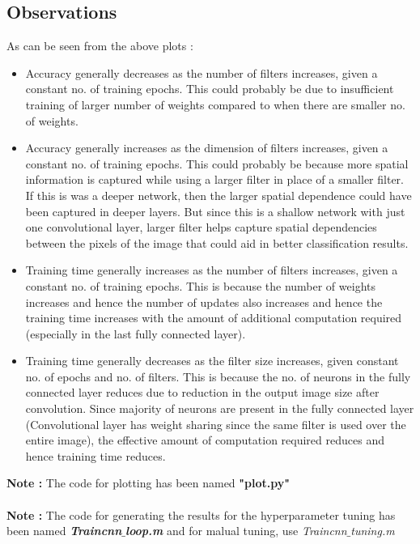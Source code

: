 \documentclass{article} %
\begin{document}
\newpage
\subsection{Observations}
As can be seen from the above plots :
\begin{itemize}
    \item Accuracy generally decreases as the number of filters increases, given a constant no. of training epochs. This could probably be due to insufficient training of larger number of weights compared to when there are smaller no. of weights.
    \item Accuracy generally increases as the dimension of filters increases, given a constant no. of training epochs. This could probably be because more spatial information is captured while using a larger filter in place of a smaller filter. If this is was a deeper network, then the larger spatial dependence could have been captured in deeper layers. But since this is a shallow network with just one convolutional layer, larger filter helps capture spatial dependencies between the pixels of the image that could aid in better classification results.
    \item Training time generally increases as the number of filters increases, given a constant no. of training epochs. This is because the number of weights increases and hence the number of updates also increases and hence the training time increases with the amount of additional computation required (especially in the last fully connected layer).
    \item Training time generally decreases as the filter size increases, given constant no. of epochs and no. of filters. This is because the no. of neurons in the fully connected layer reduces due to reduction in the output image size after convolution. Since majority of neurons are present in the fully connected layer (Convolutional layer has weight sharing since the same filter is used over the entire image), the effective amount of computation required reduces and hence training time reduces.
\end{itemize}

\textbf{Note : }The code for plotting has been named \textbf{"plot.py"}\\\\
\textbf{Note : }The code for generating the results for the hyperparameter tuning has been named \textbf{\textit{Traincnn$\_$loop.m}} and for malual tuning, use \textit{Traincnn$\_$tuning.m}
\end{document}
